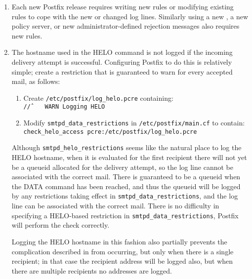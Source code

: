 \begin{enumerate}

    \item Each new Postfix release requires writing new rules or modifying
        existing rules to cope with the new or changed log lines.
        Similarly using a new , a new policy server, or new
        administrator-defined rejection messages also requires new rules.

    \item The hostname used in the HELO command is not logged if the
        incoming delivery attempt is successful.  Configuring Postfix to do
        this is relatively simple; create a restriction that is guaranteed
        to warn for every accepted mail, as follows:

        \begin{enumerate}

            \item Create \texttt{/etc/postfix/log\_helo.pcre}
                containing:\newline{}
                \tab{}\texttt{/\^/~~~~WARN~Logging~HELO}

            \item Modify \texttt{smtpd\_data\_restrictions} in
                \texttt{/etc/postfix/main.cf} to contain:\newline{}
                \tab{}\texttt{check\_helo\_access~pcre:/etc/postfix/log\_helo.pcre}

        \end{enumerate}

        Although \texttt{smtpd\_helo\_restrictions} seems like the natural
        place to log the HELO hostname, when it is evaluated for the first
        recipient there will not yet be a queueid allocated for the
        delivery attempt, so the log line cannot be associated with the
        correct mail.  There is guaranteed to be a queueid when the DATA
        command has been reached, and thus the queueid will be logged by
        any restrictions taking effect in
        \texttt{smtpd\_data\_restrictions}, and the log line can be
        associated with the correct mail.  There is no difficulty in
        specifying a HELO-based restriction in
        \texttt{smtpd\_data\_restrictions}, Postfix will perform the check
        correctly.

        Logging the HELO hostname in this fashion also partially prevents
        the complication described in  from occurring, but only when there is a
        single recipient; in that case the recipient address will be logged
        also, but when there are multiple recipients no addresses are
        logged.


\end{enumerate}
